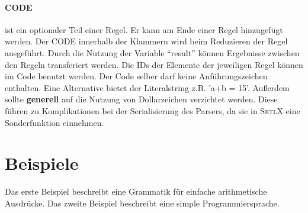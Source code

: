 \paragraph{CODE} ist ein optionaler Teil einer Regel. Er kann am Ende einer Regel hinzugefügt werden. Der CODE innerhalb der Klammern  wird beim Reduzieren der Regel ausgeführt. Durch die Nutzung der Variable "`result"' können Ergebnisse zwischen den Regeln transferiert werden. Die IDs der Elemente der jeweiligen Regel können im Code benutzt werden. Der Code selber darf keine Anführungszeichen enthalten. Eine Alternative bietet der Literalstring z.B. 'a+b = 15'. Außerdem sollte \textbf{generell} auf die Nutzung von Dollarzeichen verzichtet werden. Diese führen zu Komplikationen bei der Serialisierung des Parsers, da sie in \textsc{SetlX} eine Sonderfunktion einnehmen. 
\newpage
\section{Beispiele}
Das erste Beispiel beschreibt eine Grammatik für einfache arithmetische Ausdrücke.
Das zweite Beispiel beschreibt eine simple Programmiersprache.

